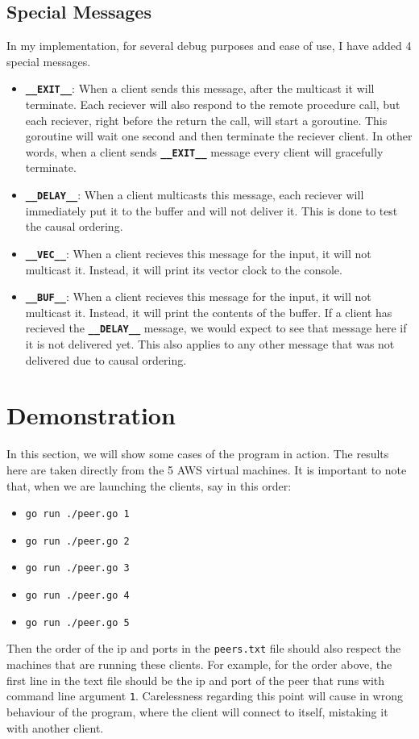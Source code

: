 \documentclass[11pt,reqno]{amsart}
\newcommand{\code}[1]{\texttt{#1}}
\begin{document}
\subsection{Special Messages}
In my implementation, for several debug purposes and ease of use, I have added 4 special messages.
\begin{itemize}
	\item \code{\textbf{\_\_EXIT\_\_}}: When a client sends this message, after the multicast it will terminate. Each reciever will also respond to the remote procedure call, but each reciever, right before the return the call, will start a goroutine. This goroutine will wait one second and then terminate the reciever client. In other words, when a client sends \code{\textbf{\_\_EXIT\_\_}} message every client will gracefully terminate.
	\item \code{\textbf{\_\_DELAY\_\_}}: When a client multicasts this message, each reciever will immediately put it to the buffer and will not deliver it. This is done to test the causal ordering.
	\item \code{\textbf{\_\_VEC\_\_}}: When a client recieves this message for the input, it will not multicast it. Instead, it will print its vector clock to the console.
	\item \code{\textbf{\_\_BUF\_\_}}: When a client recieves this message for the input, it will not multicast it. Instead, it will print the contents of the buffer. If a client has recieved the \code{\textbf{\_\_DELAY\_\_}} message, we would expect to see that message here if it is not delivered yet. This also applies to any other message that was not delivered due to causal ordering.
\end{itemize}

\section{Demonstration}
In this section, we will show some cases of the program in action. The results here are taken directly from the 5 AWS virtual machines. It is important to note that, when we are launching the clients, say in this order:
\begin{itemize}
	\item \code{go run ./peer.go 1}
	\item \code{go run ./peer.go 2}
	\item \code{go run ./peer.go 3}
	\item \code{go run ./peer.go 4}
	\item \code{go run ./peer.go 5}
\end{itemize}
Then the order of the ip and ports in the \code{peers.txt} file should also respect the machines that are running these clients. For example, for the order above, the first line in the text file should be the ip and port of the peer that runs with command line argument \code{1}. Carelessness regarding this point will cause in wrong behaviour of the program, where the client will connect to itself, mistaking it with another client. \\
\end{document}
